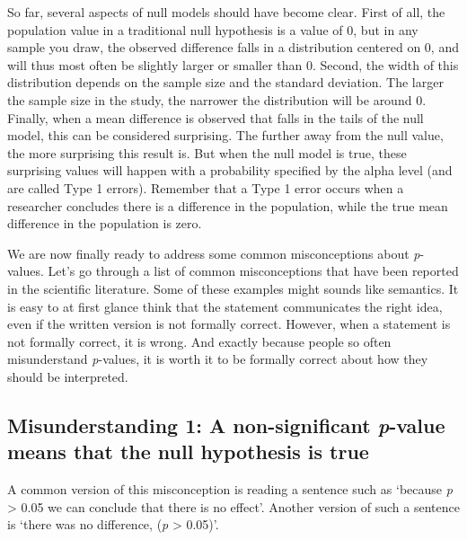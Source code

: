 \documentclass[
  oneside]{book}
\begin{document}
So far, several aspects of null models should have become clear. First of all, the population value in a traditional null hypothesis is a value of 0, but in any sample you draw, the observed difference falls in a distribution centered on 0, and will thus most often be slightly larger or smaller than 0. Second, the width of this distribution depends on the sample size and the standard deviation. The larger the sample size in the study, the narrower the distribution will be around 0. Finally, when a mean difference is observed that falls in the tails of the null model, this can be considered surprising. The further away from the null value, the more surprising this result is. But when the null model is true, these surprising values will happen with a probability specified by the alpha level (and are called Type 1 errors). Remember that a Type 1 error occurs when a researcher concludes there is a difference in the population, while the true mean difference in the population is zero.

We are now finally ready to address some common misconceptions about \emph{p}-values. Let's go through a list of common misconceptions that have been reported in the scientific literature. Some of these examples might sounds like semantics. It is easy to at first glance think that the statement communicates the right idea, even if the written version is not formally correct. However, when a statement is not formally correct, it is wrong. And exactly because people so often misunderstand \emph{p}-values, it is worth it to be formally correct about how they should be interpreted.

\hypertarget{misconception1}{%
\subsection{\texorpdfstring{Misunderstanding 1: A non-significant \emph{p}-value means that the null hypothesis is true}{Misunderstanding 1: A non-significant p-value means that the null hypothesis is true}}\label{misconception1}}

A common version of this misconception is reading a sentence such as `because \emph{p} \textgreater{} 0.05 we can conclude that there is no effect'. Another version of such a sentence is `there was no difference, (\emph{p} \textgreater{} 0.05)'.
\end{document}
